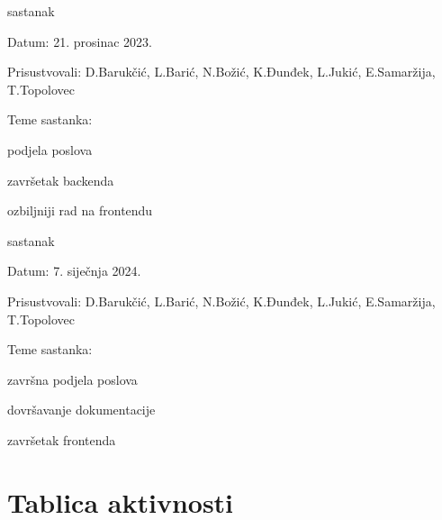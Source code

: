 \begin{packed_enum}
			\item  sastanak
			\item[] \begin{packed_item}
				\item Datum: 21. prosinac 2023.
				\item Prisustvovali: D.Barukčić, L.Barić, N.Božić, K.Đunđek, L.Jukić, E.Samaržija, T.Topolovec
				\item Teme sastanka:
				\begin{packed_item}
					\item  podjela poslova
					\item  završetak backenda
					\item  ozbiljniji rad na frontendu
				\end{packed_item}
			\end{packed_item}
			
			\item  sastanak
			\item[] \begin{packed_item}
				\item Datum: 7. siječnja 2024.
				\item Prisustvovali: D.Barukčić, L.Barić, N.Božić, K.Đunđek, L.Jukić, E.Samaržija, T.Topolovec
				\item Teme sastanka:
				\begin{packed_item}
					\item  završna podjela poslova
					\item  dovršavanje dokumentacije
					\item  završetak frontenda
				\end{packed_item}
			\end{packed_item}
			
			
		\end{packed_enum}
		
		\eject
		\section*{Tablica aktivnosti}
		
			

